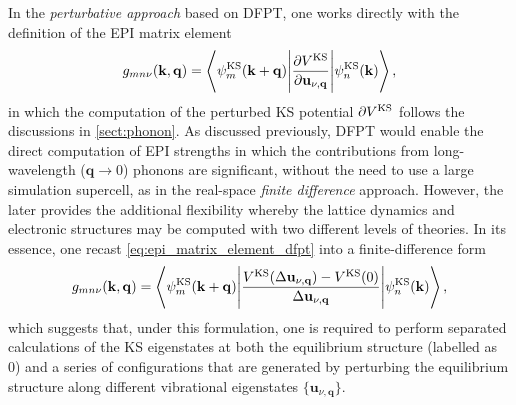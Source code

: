 In the \emph{perturbative approach} based on DFPT,\cite{giustino2017electron} one works directly with the definition of the EPI matrix element
\begin{equation}
    \label{eq:epi_matrix_element_dfpt}
    g_{mn\nu}(\mathbf{k},\mathbf{q})=\left\langle\psi_{m}^{\mbox{\scriptsize{KS}}}(\mathbf{k}+\mathbf{q})\Bigg\vert \frac{\partial V^{\mbox{\scriptsize{KS}}}}{\partial \mathbf{u}_{\nu,\mathbf{q}}} \Bigg\vert  \psi_{n}^{\mbox{\scriptsize{KS}}}(\mathbf{k})\right\rangle,
\end{equation}
in which the computation of the perturbed KS potential $\partial V^{\mbox{\scriptsize{KS}}}$ follows the discussions in \cref{sect:phonon}. As discussed previously, DFPT would enable the direct computation of EPI strengths in which the contributions from long-wavelength ($\bm{q}\to0$) phonons are significant, without the need to use a large simulation supercell, as in the real-space \textit{finite difference} approach.\cite{monserrat2018electron} However, the later provides the additional flexibility whereby the lattice dynamics and electronic structures may be computed with two different levels of theories. In its essence, one recast \cref{eq:epi_matrix_element_dfpt} into a finite-difference form 
\begin{equation}
    \label{eq:epi_matrix_element_finite_diff}
    g_{mn\nu}(\mathbf{k},\mathbf{q})=\left\langle\psi_{m}^{\mbox{\scriptsize{KS}}}(\mathbf{k}+\mathbf{q})\Bigg\vert \frac{ V^{\mbox{\scriptsize{KS}}}(\Delta \mathbf{u}_{\nu,\mathbf{q}}) -V^{\mbox{\scriptsize{KS}}} (0) }{\Delta \mathbf{u}_{\nu,\mathbf{q}}} \Bigg\vert  \psi_{n}^{\mbox{\scriptsize{KS}}}(\mathbf{k})\right\rangle,
\end{equation}
which suggests that, under this formulation, one is required to perform separated calculations of the KS eigenstates at both the equilibrium structure (labelled as 0) and a series of  configurations that are generated by perturbing the equilibrium structure along different vibrational eigenstates $\{\bm{u}_{\nu,\bm{q}}\}$.


